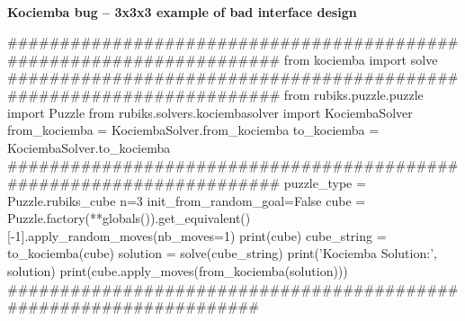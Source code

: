 \paragraph{}{\textbf{Kociemba bug -- 3x3x3 example of \textbf{bad} interface design}}
\begin{python}
#####################################################################
from kociemba import solve
#####################################################################
from rubiks.puzzle.puzzle import Puzzle
from rubiks.solvers.kociembasolver import KociembaSolver
from_kociemba = KociembaSolver.from_kociemba
to_kociemba = KociembaSolver.to_kociemba
#####################################################################
puzzle_type = Puzzle.rubiks_cube
n=3
init_from_random_goal=False
cube = Puzzle.factory(**globals()).get_equivalent()[-1].apply_random_moves(nb_moves=1)
print(cube)
cube_string = to_kociemba(cube)
solution = solve(cube_string)
print('Kociemba Solution:', solution)
print(cube.apply_moves(from_kociemba(solution)))
###################################################################
\end{python}
\black

